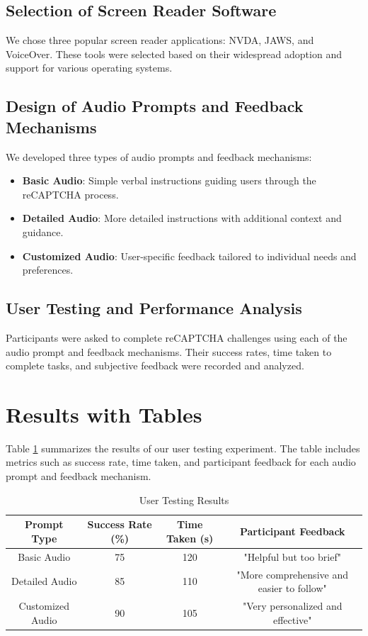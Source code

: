 \documentclass{article}
\begin{document}
\subsection{Selection of Screen Reader Software}
We chose three popular screen reader applications: NVDA, JAWS, and VoiceOver. These tools were selected based on their widespread adoption and support for various operating systems.

\subsection{Design of Audio Prompts and Feedback Mechanisms}
We developed three types of audio prompts and feedback mechanisms:
\begin{itemize}
    \item \textbf{Basic Audio}: Simple verbal instructions guiding users through the reCAPTCHA process.
    \item \textbf{Detailed Audio}: More detailed instructions with additional context and guidance.
    \item \textbf{Customized Audio}: User-specific feedback tailored to individual needs and preferences.
\end{itemize}

\subsection{User Testing and Performance Analysis}
Participants were asked to complete reCAPTCHA challenges using each of the audio prompt and feedback mechanisms. Their success rates, time taken to complete tasks, and subjective feedback were recorded and analyzed.

\section{Results with Tables}
Table \ref{tab:results} summarizes the results of our user testing experiment. The table includes metrics such as success rate, time taken, and participant feedback for each audio prompt and feedback mechanism.

\begin{table}[ht]
    \centering
    \caption{User Testing Results}
    \label{tab:results}
    \begin{tabular}{|c|c|c|c|}
        \hline
        \textbf{Prompt Type} & \textbf{Success Rate (\%)} & \textbf{Time Taken (s)} & \textbf{Participant Feedback} \\
        \hline
        Basic Audio & 75 & 120 & "Helpful but too brief" \\
        Detailed Audio & 85 & 110 & "More comprehensive and easier to follow" \\
        Customized Audio & 90 & 105 & "Very personalized and effective" \\
        \hline
    \end{tabular}
\end{table}
\end{document}
